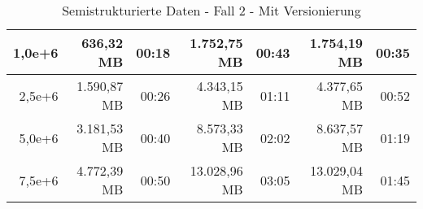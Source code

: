 \begin{table}
\begin{tabular}{|r|r|r|r|r|r|r|}
        1,0e+6          & 636,32 MB           & 00:18           & 1.752,75 MB         & 00:43           & 1.754,19 MB         & 00:35           \\ \hline
        2,5e+6          & 1.590,87 MB         & 00:26           & 4.343,15 MB         & 01:11           & 4.377,65 MB         & 00:52           \\ \hline
        5,0e+6          & 3.181,53 MB         & 00:40           & 8.573,33 MB         & 02:02           & 8.637,57 MB         & 01:19           \\ \hline
        7,5e+6          & 4.772,39 MB         & 00:50           & 13.028,96 MB        & 03:05           & 13.029,04 MB        & 01:45           \\ \hline
    \end{tabular}
    \caption{Semistrukturierte Daten - Fall 2 - Mit Versionierung}
\end{table}















